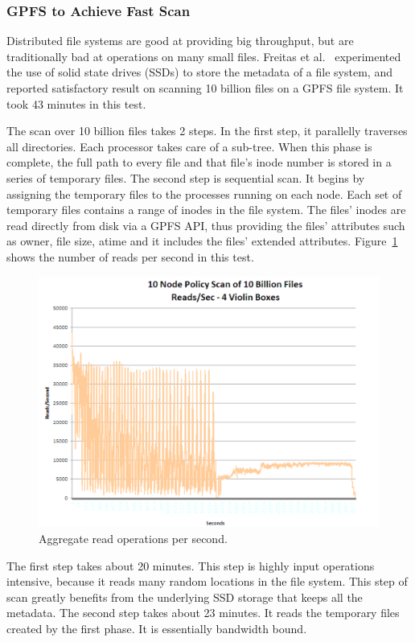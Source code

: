 \subsubsection{GPFS to Achieve Fast Scan}
Distributed file systems are good at providing big throughput, but are traditionally
bad at operations on many small files.
%
Freitas et al.~\cite{freitas2011gpfs} experimented the use of solid state drives
(SSDs) to store the metadata of a file system, and reported satisfactory
result on scanning 10 billion files on a GPFS file system.
%
It took 43 minutes in this test.

The scan over 10 billion files takes 2 steps.
%
In the first step, it parallelly traverses all directories. 
%
Each processor takes care of a sub-tree.
%
When this phase is complete, the full path to every file and that file’s inode number is stored in a series of temporary files.
%
The second step is sequential scan.
%
It begins by assigning the temporary files to the processes running on each node.
%
Each set of temporary files contains a range of inodes in the file system.
%
The files’ inodes are read directly from disk via a GPFS API, thus providing 
the files’ attributes such as owner, file size, atime and it includes 
the files’ extended attributes.
%
Figure~\ref{fig:gpfs_scan} shows the number of reads per second in this test.
%
\begin{figure}
\centering
\includegraphics[width=0.99\columnwidth]{image/gpfs_scan.png}
\caption{Aggregate read operations per second.}
\label{fig:gpfs_scan}
\end{figure}

The first step takes about 20 minutes. 
%
This step is highly input operations intensive, because it reads many random
locations in the file system.
%
This step of scan greatly benefits from the underlying SSD storage that keeps 
all the metadata.
%
The second step takes about 23 minutes.
%
It reads the temporary files created by the first phase. 
%
It is essentially bandwidth bound.


